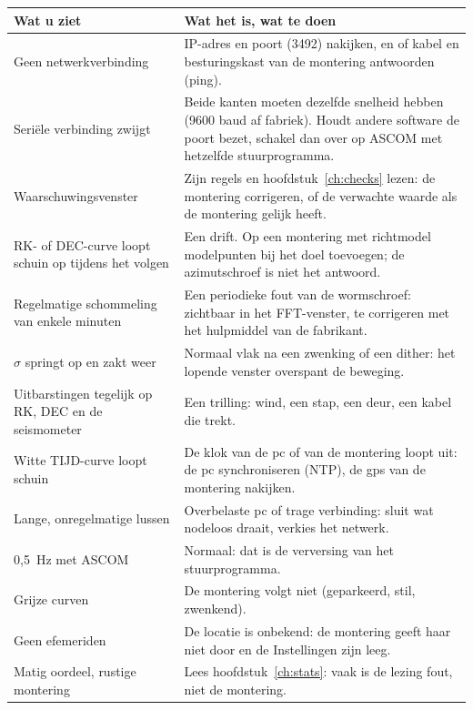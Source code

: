 \begin{center}
\begin{tabularx}{\textwidth}{p{4cm}X}
\toprule
\textbf{Wat u ziet} & \textbf{Wat het is, wat te doen} \\
\midrule
Geen netwerkverbinding & IP-adres en poort (3492) nakijken, en of kabel en
besturingskast van de montering antwoorden (ping). \\
Seriële verbinding zwijgt & Beide kanten moeten dezelfde snelheid hebben (9600
baud af fabriek). Houdt andere software de poort bezet, schakel dan over op
ASCOM met hetzelfde stuurprogramma. \\
Waarschuwingsvenster & Zijn regels en hoofdstuk~\ref{ch:checks} lezen: de
montering corrigeren, of de verwachte waarde als de montering gelijk heeft. \\
RK- of DEC-curve loopt schuin op tijdens het volgen & Een drift. Op een montering
met richtmodel modelpunten bij het doel toevoegen; de azimutschroef is niet het
antwoord. \\
Regelmatige schommeling van enkele minuten & Een periodieke fout van de
wormschroef: zichtbaar in het FFT-venster, te corrigeren met het hulpmiddel van
de fabrikant. \\
$\sigma$ springt op en zakt weer & Normaal vlak na een zwenking of een dither:
het lopende venster overspant de beweging. \\
Uitbarstingen tegelijk op RK, DEC en de seismometer & Een trilling: wind, een
stap, een deur, een kabel die trekt. \\
Witte TIJD-curve loopt schuin & De klok van de pc of van de montering loopt
uit: de pc synchroniseren (NTP), de gps van de montering nakijken. \\
Lange, onregelmatige lussen & Overbelaste pc of trage verbinding: sluit wat
nodeloos draait, verkies het netwerk. \\
0,5~Hz met ASCOM & Normaal: dat is de verversing van het stuurprogramma. \\
Grijze curven & De montering volgt niet (geparkeerd, stil, zwenkend). \\
Geen efemeriden & De locatie is onbekend: de montering geeft haar niet door en
de Instellingen zijn leeg. \\
Matig oordeel, rustige montering & Lees hoofdstuk~\ref{ch:stats}: vaak is de
lezing fout, niet de montering. \\
\bottomrule
\end{tabularx}
\end{center}

